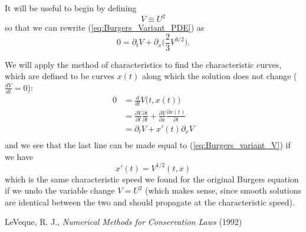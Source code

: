 \documentclass[12pt]{article}
\numberwithin{equation}{section}
\begin{document}
It will be useful to begin by defining
\begin{equation}
V \equiv U^2
\end{equation}
so that we can rewrite (\ref{eq:Burgers_Variant_PDE}) as
\begin{equation} \label{eq:Burgers_variant_V}
0 = \partial_t V + \partial_x \Big( \frac{2}{3} V^{3/2} \Big).
\end{equation}

We will apply the method of characteristics to find the characteristic curves,
which are defined to be curves $x(t)$ along which the solution does not change
($\frac{d V}{d t} = 0$):
\begin{equation}
\begin{aligned}
0 &= \frac{d}{d t} V \big( t, x(t) \big)\\
&= \frac{\partial V}{\partial t} \frac{\partial t}{\partial t}
    + \frac{\partial V}{\partial x} \frac{\partial x(t)}{\partial t} \\
&= \partial_t V + x'(t) \partial_x V \\
\end{aligned}
\end{equation}
and we see that the last line can be made equal to
(\ref{eq:Burgers_variant_V}) if we have
\begin{equation}
x'(t) = V^{1/2}(t, x)
\end{equation}
which is the same characteristic speed we found for the original Burgers
equation if we undo the variable change $V = U^2$ (which makes sense,
since smooth solutions are identical between the two and should propagate
at the characteristic speed).

\clearpage

\begin{thebibliography}{10}
 LeVeque, R. J.,
    \textit{Numerical Methods for Conservation Laws} (1992)
\end{thebibliography}
\end{document}
